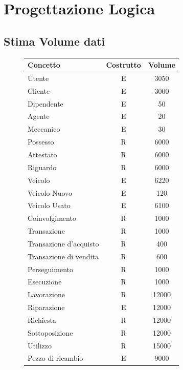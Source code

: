 \documentclass[a4paper,12pt]{report}
\begin{document}
\chapter{Progettazione Logica}

\section{Stima Volume dati}
\begin{figure}[H]
	\fontsize{14pt}{12pt}\selectfont
	\advance\leftskip-15cm
	\centering
	\begin{tabular}{l c c }
		\rowcolor{BlueGreen}
		\rule[-3mm]{0mm}{0.85cm}
		\textbf{Concetto} & \textbf{Costrutto} &\textbf{Volume} \\
		\hline\rule[-2mm]{0mm}{0.75cm}
		Utente & E & 3050\\
		\hline\rule[-2mm]{0mm}{0.75cm}
		Cliente & E & 3000 \\
		\hline\rule[-2mm]{0mm}{0.75cm}
		Dipendente & E & 50\\
		\hline\rule[-2mm]{0mm}{0.75cm}
		Agente & E & 20\\
		\hline\rule[-2mm]{0mm}{0.75cm}
		Meccanico & E & 30\\
		\hline\rule[-2mm]{0mm}{0.75cm}
		Possesso & R & 6000 \\
		\hline\rule[-2mm]{0mm}{0.75cm}
		Attestato & R & 6000\\
		\hline\rule[-2mm]{0mm}{0.75cm}
		Riguardo & R & 6000 \\
		\hline\rule[-2mm]{0mm}{0.75cm}
		Veicolo & E & 6220 \\
		\hline\rule[-2mm]{0mm}{0.75cm}
		Veicolo Nuovo & E & 120 \\
		\hline\rule[-2mm]{0mm}{0.75cm}
		Veicolo Usato & E & 6100 \\
		\hline\rule[-2mm]{0mm}{0.75cm}
		Coinvolgimento & R & 1000\\
		\hline\rule[-2mm]{0mm}{0.75cm}
		Transazione & R & 1000\\
		\hline\rule[-2mm]{0mm}{0.75cm}
		Transazione d'acquisto& R & 400\\
		\hline\rule[-2mm]{0mm}{0.75cm}
		Transazione di vendita& R & 600\\
		\hline\rule[-2mm]{0mm}{0.75cm}
		Perseguimento & R & 1000\\
		\hline\rule[-2mm]{0mm}{0.75cm}
		Esecuzione & R & 1000\\
		\hline\rule[-2mm]{0mm}{0.75cm}
		Lavorazione & R & 12000\\
		\hline\rule[-2mm]{0mm}{0.75cm}
		Riparazione & E & 12000\\
		\hline\rule[-2mm]{0mm}{0.75cm}
		Richiesta & R & 12000\\
		\hline\rule[-2mm]{0mm}{0.75cm}
		Sottoposizione & R & 12000\\
		\hline\rule[-2mm]{0mm}{0.75cm}
		Utilizzo & R & 15000\\
		\hline\rule[-2mm]{0mm}{0.75cm}
		Pezzo di ricambio & E &  9000\\
		\hline
	\end{tabular}
\end{figure}
\end{document}
